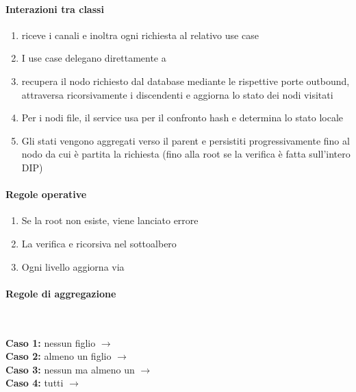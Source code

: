\paragraph{Interazioni tra classi}
\begin{enumerate}[labelwidth=0.8cm,leftmargin=1cm]
	\item {} riceve i canali  e inoltra ogni richiesta al relativo use case
	\item I use case  delegano direttamente a 
	\item {} recupera il nodo richiesto dal database mediante le rispettive porte outbound, attraversa ricorsivamente i discendenti e aggiorna lo stato dei nodi visitati
	\item Per i nodi file, il service usa  per il confronto hash e determina lo stato locale
	\item Gli stati vengono aggregati verso il parent e persistiti progressivamente fino al nodo da cui è partita la richiesta (fino alla root se la verifica è fatta sull'intero DIP)
\end{enumerate}

\paragraph{Regole operative}
\begin{enumerate}[labelwidth=0.8cm,leftmargin=1cm]
	\item Se la root non esiste, viene lanciato errore
	\item La verifica e ricorsiva nel sottoalbero
	\item Ogni livello aggiorna  via 
\end{enumerate}

\paragraph{Regole di aggregazione}\mbox{}\

\noindent
\textbf{Caso 1:} nessun figlio $\to$ \\
\textbf{Caso 2:} almeno un figlio  $\to$ \\
\textbf{Caso 3:} nessun  ma almeno un  $\to$ \\
\textbf{Caso 4:} tutti  $\to$ 


